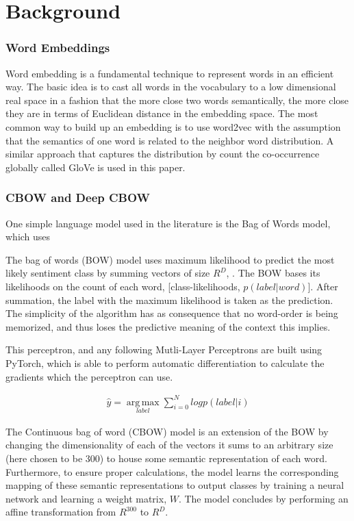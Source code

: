 \section{Background}
\label{sec: background}
\subsubsection{Word Embeddings}
Word embedding is a fundamental technique to represent words in an efficient
way. The basic idea is to cast all words in the vocabulary to a low dimensional
real space in a fashion that the more close two words semantically, the more
close they are in terms of Euclidean distance in the embedding space. The most
common way to build up an embedding is to use
word2vec\cite{mikolov2013distributed} with the assumption that the semantics of
one word is related to the neighbor word distribution. A similar approach that
captures the distribution by count the co-occurrence globally called
GloVe\cite{pennington2014glove} is used in this paper.


\subsubsection{CBOW and Deep CBOW}
One simple language model used in the literature is the Bag of Words model,
which uses

The bag of words (BOW) model uses maximum likelihood to predict the most likely
sentiment class by summing vectors of size $R^{D}$, . The BOW bases its
likelihoods on the count of each word, [class-likelihoods, $p(label|word)$].
After summation, the label with the maximum likelihood is taken as the
prediction. The simplicity of the algorithm has as consequence that no
word-order is being memorized, and thus loses the predictive meaning of the
context this implies.


This perceptron,
and any following Mutli-Layer Perceptrons are built using PyTorch, which is able
to perform automatic differentiation\cite{paszke2017automatic} to calculate the
gradients which the perceptron can use.



\begin{align*}
    \hat{y} = \operatorname*{arg\,max}_{label} \sum^{N}_{i=0} log p(label|i)
\end{align*}

The Continuous bag of word (CBOW) model is an extension of the BOW by changing
the dimensionality of each of the vectors it sums to an arbitrary size (here
chosen to be 300) to house some semantic representation of each word.
Furthermore, to ensure proper calculations, the model learns the corresponding
mapping of these semantic representations to output classes by training a neural
network and learning a weight matrix, $W$. The model concludes by performing an
affine transformation from $R^{300}$ to $R^D$.

